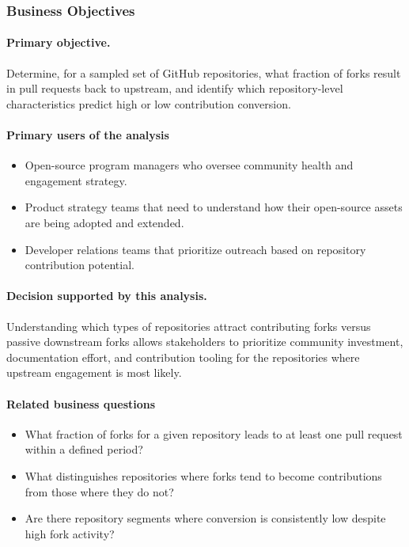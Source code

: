 \subsubsection{Business Objectives}
\paragraph{Primary objective.}
Determine, for a sampled set of GitHub repositories, what fraction of forks result in pull requests back to upstream, and identify which repository-level characteristics predict high or low contribution conversion.

\paragraph{Primary users of the analysis}
\begin{itemize}
  \item Open-source program managers who oversee community health and engagement strategy.
  \item Product strategy teams that need to understand how their open-source assets are being adopted and extended.
  \item Developer relations teams that prioritize outreach based on repository contribution potential.
\end{itemize}

\paragraph{Decision supported by this analysis.}
Understanding which types of repositories attract contributing forks versus passive downstream forks allows stakeholders to prioritize community investment, documentation effort, and contribution tooling for the repositories where upstream engagement is most likely.

\paragraph{Related business questions}
\begin{itemize}
  \item What fraction of forks for a given repository leads to at least one pull request within a defined period?
  \item What distinguishes repositories where forks tend to become contributions from those where they do not?
  \item Are there repository segments where conversion is consistently low despite high fork activity?
\end{itemize}

